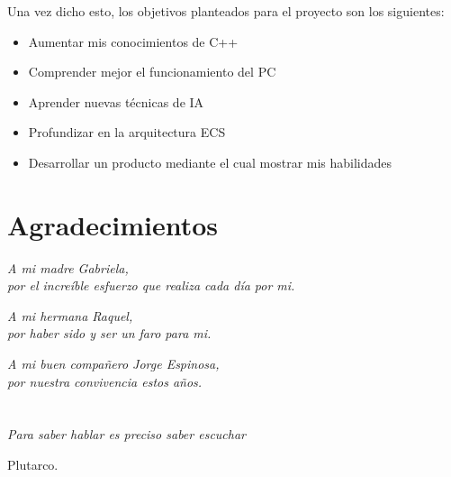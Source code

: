 Una vez dicho esto, los objetivos planteados para el proyecto son los siguientes:
\begin{itemize}
	\item Aumentar mis conocimientos de C++
	\item Comprender mejor el funcionamiento del \ac{PC}
	\item Aprender nuevas técnicas de \ac{IA}
	\item Profundizar en la arquitectura \ac{ECS}
	\item Desarrollar un producto mediante el cual mostrar mis habilidades
\end{itemize}

\cleardoublepage %
\chapter*{Agradecimientos}
\setlength{\leftmargin}{0.5\textwidth}
\setlength{\parsep}{0cm}
\addtolength{\topsep}{0.5cm}
\begin{flushright}
\small\em{
A mi madre Gabriela,\\
por el increíble esfuerzo que realiza cada día por mi. 
}
\end{flushright}
\begin{flushright}
\small\em{
A mi hermana Raquel,\\
por haber sido y ser un faro para mi. 
}
\end{flushright}
\begin{flushright}
\small\em{
A mi buen compañero Jorge Espinosa,\\
por nuestra convivencia estos años. 
}
\end{flushright}

\cleardoublepage %
\chapter*{}
\setlength{\leftmargin}{0.5\textwidth}
\setlength{\parsep}{0cm}
\addtolength{\topsep}{0.5cm}
\begin{flushright}
\small\em{
Para saber hablar es preciso saber escuchar\\
}
\end{flushright}
\begin{flushright}
\small{
Plutarco.
}
\end{flushright}
\cleardoublepage %
